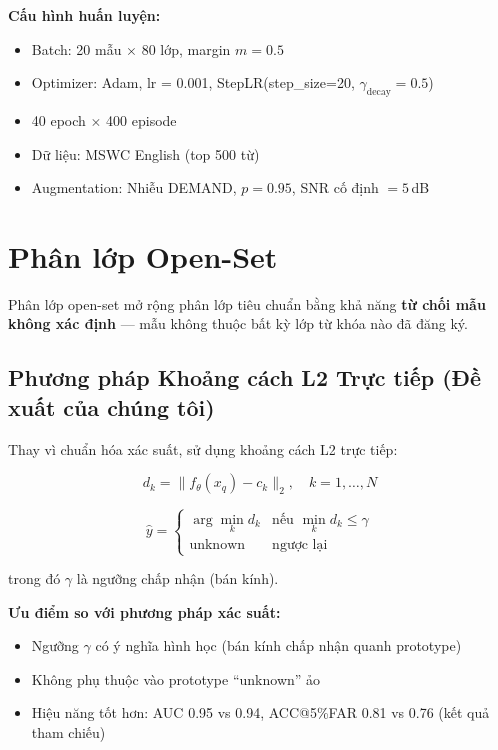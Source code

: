 \documentclass[12pt,a4paper]{report}
\begin{document}
\textbf{Cấu hình huấn luyện:}
\begin{itemize}
    \item Batch: 20 mẫu $\times$ 80 lớp, margin $m = 0.5$
    \item Optimizer: Adam, lr = 0.001, StepLR(step\_size=20, $\gamma_{\text{decay}}=0.5$)
    \item 40 epoch $\times$ 400 episode
    \item Dữ liệu: MSWC English (top 500 từ)
    \item Augmentation: Nhiễu DEMAND, $p = 0.95$, SNR cố định $= 5$\,dB
\end{itemize}


\section{Phân lớp Open-Set}
\label{sec:openset_vi}

Phân lớp open-set mở rộng phân lớp tiêu chuẩn bằng khả năng \textbf{từ chối
mẫu không xác định} --- mẫu không thuộc bất kỳ lớp từ khóa nào đã đăng ký.

\subsection{Phương pháp Khoảng cách L2 Trực tiếp (Đề xuất của chúng tôi)}

Thay vì chuẩn hóa xác suất, sử dụng khoảng cách L2 trực tiếp:

\begin{equation}
    d_k = \|f_\theta(x_q) - c_k\|_2, \quad k = 1, \ldots, N
\end{equation}

\begin{equation}
    \hat{y} = \begin{cases}
        \displaystyle\arg\min_k d_k & \text{nếu } \min_k d_k \leq \gamma \\
        \text{unknown} & \text{ngược lại}
    \end{cases}
\end{equation}

trong đó $\gamma$ là ngưỡng chấp nhận (bán kính).

\textbf{Ưu điểm so với phương pháp xác suất:}
\begin{itemize}
    \item Ngưỡng $\gamma$ có ý nghĩa hình học (bán kính chấp nhận quanh prototype)
    \item Không phụ thuộc vào prototype ``unknown'' ảo
    \item Hiệu năng tốt hơn: AUC 0.95 vs 0.94, ACC@5\%FAR 0.81 vs 0.76
          (kết quả tham chiếu)
\end{itemize}
\end{document}
